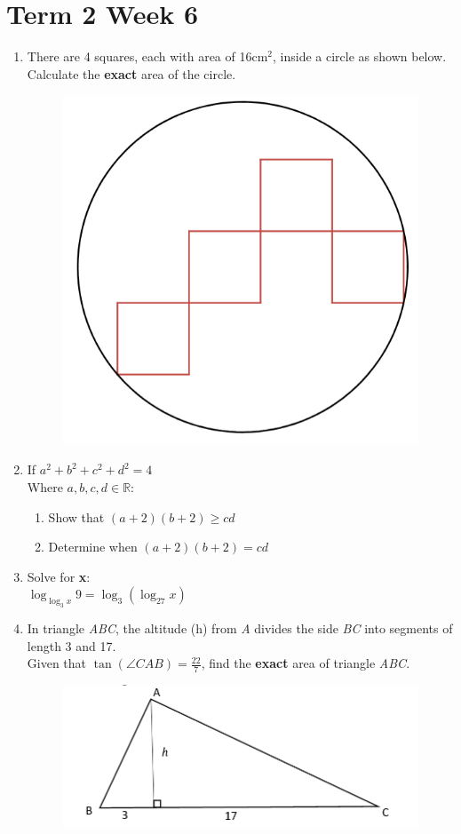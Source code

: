 \documentclass[../main.tex]{subfiles}
\begin{document}
\section*{Term 2 Week 6}
\begin{enumerate}
    \item 
    There are 4 squares, each with area of 16cm\(^2\), inside a circle as shown below. Calculate the \textbf{exact} area of the circle.
    \begin{figure}[h]
        \centering
        \includegraphics[width=0.3\linewidth]{images/t2w6q1.png}
    \end{figure}
    
    \item 
    If \(a^2+b^2+c^2+d^2=4\)\\
    Where \(a,b,c,d \in \mathbb{R}\):
        \begin{enumerate}
            \item 
            Show that \((a+2)(b+2)\geq cd\)\\

            \item 
            Determine when \((a+2)(b+2)=cd\)\\
        \end{enumerate}

    \item 
    Solve for \textbf{x}:\\

    \(\log_{\log_3{x}}{9}=\log_3{(\log_{27}{x})}\)\\

    \item 
    In triangle \textit{ABC}, the altitude (h) from \textit{A} divides the side \textit{BC} into segments of length 3 and 17.\\
    Given that \(\tan{(\angle CAB)}=\frac{22}{7}\), find the \textbf{exact} area of triangle \textit{ABC}.
    \begin{figure}[h]
        \centering
        \includegraphics{images/t2w6q4.png}
    \end{figure}
    
    \end{enumerate}
\end{document}
